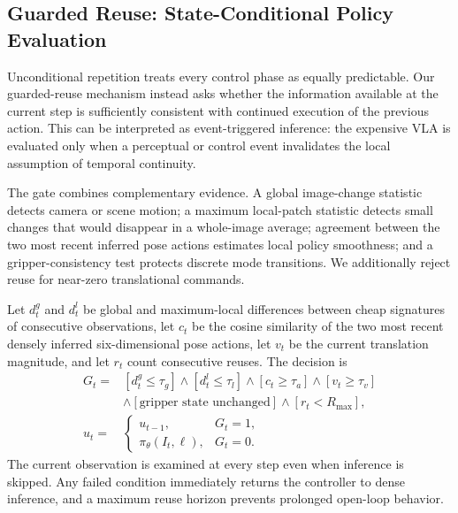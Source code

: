 \subsection{Guarded Reuse: State-Conditional Policy Evaluation}
\label{sec:method_guarded_reuse}

Unconditional repetition treats every control phase as equally predictable.
Our guarded-reuse mechanism instead asks whether the information available at
the current step is sufficiently consistent with continued execution of the
previous action. This can be interpreted as event-triggered inference: the
expensive VLA is evaluated only when a perceptual or control event invalidates
the local assumption of temporal continuity.

The gate combines complementary evidence. A global image-change statistic
detects camera or scene motion; a maximum local-patch statistic detects small
changes that would disappear in a whole-image average; agreement between the
two most recent inferred pose actions estimates local policy smoothness; and a
gripper-consistency test protects discrete mode transitions. We additionally
reject reuse for near-zero translational commands.

Let $d_t^g$ and $d_t^l$ be global and maximum-local differences between cheap
signatures of consecutive observations, let $c_t$ be the cosine similarity of
the two most recent densely inferred six-dimensional pose actions, let $v_t$
be the current translation magnitude, and let $r_t$ count consecutive reuses.
The decision is
\begin{equation}
\begin{aligned}
G_t ={}&
[d_t^g \le \tau_g] \wedge [d_t^l \le \tau_l]
\wedge [c_t \ge \tau_a] \wedge [v_t \ge \tau_v] \\
&\wedge [\text{gripper state unchanged}]
\wedge [r_t < R_{\max}], \\[2pt]
u_t ={}&
\begin{cases}
u_{t-1}, & G_t = 1,\\
\pi_\theta(I_t,\ell), & G_t = 0.
\end{cases}
\end{aligned}
\label{eq:guarded_reuse}
\end{equation}
The current observation is examined at every step even when inference is
skipped. Any failed condition immediately returns the controller to dense
inference, and a maximum reuse horizon prevents prolonged open-loop behavior.

